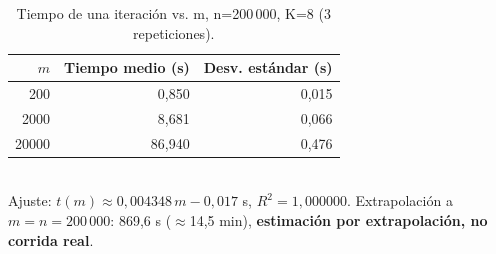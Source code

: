 \begin{table}[H]\centering
\caption{Tiempo de una iteración vs. m, n=200\,000, K=8 (3 repeticiones).}
\label{tab:costo_m}
\begin{tabular}{rrr}\toprule
\rowcolor{gray!25}
\textbf{$m$} & \textbf{Tiempo medio (s)} & \textbf{Desv. estándar (s)} \\\midrule
200 & 0,850 & 0,015 \\
2000 & 8,681 & 0,066 \\
20000 & 86,940 & 0,476 \\
\bottomrule\end{tabular}\\[0.3em]
\footnotesize Ajuste: $t(m)\approx 0,004348\,m - 0,017$ s, $R^2=1,000000$. Extrapolación a $m=n=200\,000$: 869,6 s ($\approx$14,5 min), \textbf{estimación por extrapolación, no corrida real}.
\end{table}
